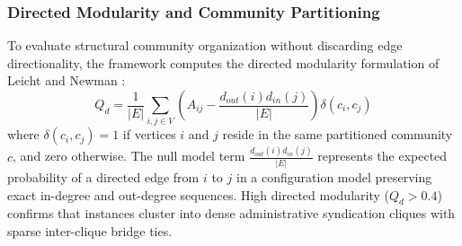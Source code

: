 \documentclass[conference]{IEEEtran}
\begin{document}
\subsubsection{Directed Modularity and Community Partitioning}
To evaluate structural community organization without discarding edge directionality, the framework computes the directed modularity formulation of Leicht and Newman \cite{newman2003structure}:
\begin{equation}
    Q_d = \frac{1}{|E|} \sum_{i,j \in V} \left( A_{ij} - \frac{d_{out}(i) d_{in}(j)}{|E|} \right) \delta(c_i, c_j)
    \label{eq:directed_modularity}
\end{equation}
where $\delta(c_i, c_j) = 1$ if vertices $i$ and $j$ reside in the same partitioned community $c$, and zero otherwise. The null model term $\frac{d_{out}(i) d_{in}(j)}{|E|}$ represents the expected probability of a directed edge from $i$ to $j$ in a configuration model preserving exact in-degree and out-degree sequences. High directed modularity ($Q_d > 0.4$) confirms that instances cluster into dense administrative syndication cliques with sparse inter-clique bridge ties.
\end{document}
